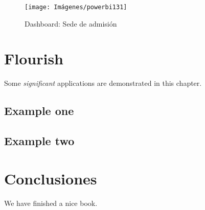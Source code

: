 \documentclass[
]{book}
\begin{document}
\begin{figure}

{\centering \texttt{[image: Imágenes/powerbi131]} 

}

\caption{Dashboard: Sede de admisión}\label{fig:tablerosededeadmision-fig}
\end{figure}

\hypertarget{flourish}{%
\chapter{Flourish}\label{flourish}}

Some \emph{significant} applications are demonstrated in this chapter.

\hypertarget{example-one}{%
\section{Example one}\label{example-one}}

\hypertarget{example-two}{%
\section{Example two}\label{example-two}}

\hypertarget{conclu}{%
\chapter{Conclusiones}\label{conclu}}

We have finished a nice book.

  
\end{document}
